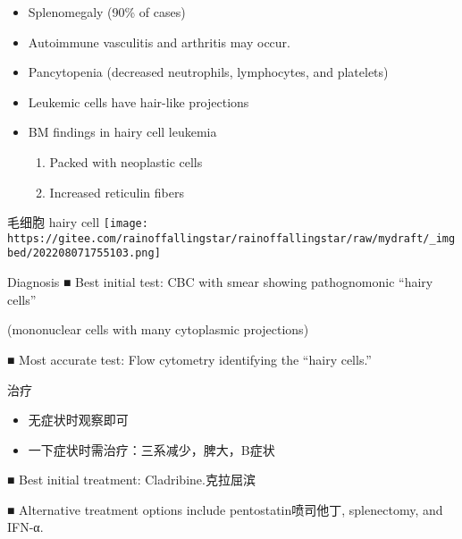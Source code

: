\documentclass[
  ignorenonframetext,
]{beamer}
\begin{document}
\begin{frame}
\begin{itemize}
\item
  Splenomegaly (90\% of cases)
\item
  Autoimmune vasculitis and arthritis may occur.
\item
  Pancytopenia (decreased neutrophils, lymphocytes, and platelets)
\item
  Leukemic cells have hair-like projections
\item
  BM findings in hairy cell leukemia

  \begin{enumerate}
  [(1)]
  \item
    Packed with neoplastic cells
  \item
    Increased reticulin fibers
  \end{enumerate}
\end{itemize}
\end{frame}

\begin{frame}
\begin{block}{毛细胞 hairy cell}
\protect\hypertarget{ux6bdbux7ec6ux80de-hairy-cell}{}
\texttt{[image: https://gitee.com/rainoffallingstar/rainoffallingstar/raw/mydraft/\_imgbed/202208071755103.png]}
\end{block}
\end{frame}

\begin{frame}
\begin{block}{Diagnosis}
\protect\hypertarget{diagnosis-3}{}
■ Best initial test: CBC with smear showing pathognomonic ``hairy
cells''

(mononuclear cells with many cytoplasmic projections)

■ Most accurate test: Flow cytometry identifying the ``hairy cells.''
\end{block}
\end{frame}

\begin{frame}
\begin{block}{治疗}
\protect\hypertarget{ux6cbbux7597-9}{}
\begin{itemize}
\item
  无症状时观察即可
\item
  一下症状时需治疗：三系减少，脾大，B症状
\end{itemize}

■ Best initial treatment: Cladribine.克拉屈滨

■ Alternative treatment options include pentostatin喷司他丁,
splenectomy, and IFN-α.
\end{block}
\end{frame}
\end{document}
